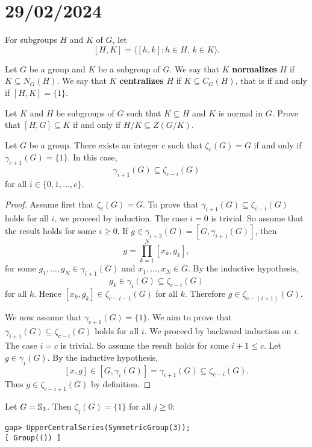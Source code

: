 \section{29/02/2024}

For subgroups $H$ and $K$ of $G$, let 
\[
[H,K]=\langle [h,k]:h\in H,\,k\in K\rangle.
\]

Let $G$ be a group and $K$ be a subgroup of $G$. We say that $K$ \textbf{normalizes} 
$H$ if $K\subseteq N_G(H)$.
We say that $K$ \textbf{centralizes} 
$H$ if $K\subseteq C_G(H)$, that is if and only if $[H,K]=\{1\}$.

\begin{exercise}
Let $K$ and $H$ be subgroups of $G$ such that $K\subseteq H$ and $K$ is normal in $G$.
Prove that $[H,G]\subseteq K$ if and only if $H/K\subseteq Z(G/K)$. 
\end{exercise}

\begin{lemma}
\label{lem:gamma_zeta}
Let $G$ be a group. There exists an integer $c$ such that 
$\zeta_c(G)=G$ if and only if 
$\gamma_{c+1}(G)=\{1\}$. In this case, 
\[
\gamma_{i+1}(G)\subseteq\zeta_{c-i}(G)
\]
for all $i\in\{0,1,\dots,c\}$. 
\end{lemma}

\begin{proof}
Assume first that $\zeta_c(G)=G$. To prove that 
$\gamma_{i+1}(G)\subseteq\zeta_{c-i}(G)$ holds for all $i$, we proceed by induction. 
The case $i=0$ is trivial. So assume that the result holds for some $i\geq0$. If
$g\in\gamma_{i+2}(G)=[G,\gamma_{i+1}(G)]$, then     
\[
g=\prod_{k=1}^N [x_k,g_k],
\]
for some $g_1,\dots,g_N\in\gamma_{i+1}(G)$ and $x_1,\dots,x_N\in G$. By the inductive 
hypothesis, 
	\[
	g_k\in\gamma_i(G)\subseteq\zeta_{c-i}(G)
	\]
for all $k$. Hence $[x_k,g_k]\in\zeta_{c-i-1}(G)$ for all $k$. Therefore   
$g\in\zeta_{c-(i+1)}(G)$. 
	
We now assume that $\gamma_{c+1}(G)=\{1\}$. We aim to prove that 
$\gamma_{i+1}(G)\subseteq\zeta_{c-i}(G)$ holds for all $i$. We proceed by backward induction on $i$. 
The case $i=c$ is trivial. So assume the result holds for some $i+1\leq c$. 
Let $g\in\gamma_{i}(G)$. By the inductive hypothesis, 
	\[
	[x,g]\in [G,\gamma_i(G)]=\gamma_{i+1}(G)\subseteq\zeta_{c-i}(G).
	\]
Thus $g\in\zeta_{c-i+1}(G)$ by definition. 
\end{proof}

\begin{example}
Let $G=\mathbb{S}_3$. Then $\zeta_j(G)=\{1\}$ for all $j\geq 0$: 
\begin{lstlisting}
gap> UpperCentralSeries(SymmetricGroup(3));
[ Group(()) ]
\end{lstlisting}
\end{example}

